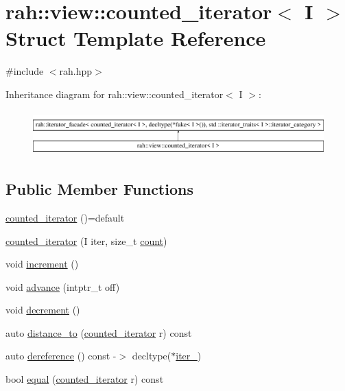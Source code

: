 \hypertarget{structrah_1_1view_1_1counted__iterator}{}\section{rah\+::view\+::counted\+\_\+iterator$<$ I $>$ Struct Template Reference}
\label{structrah_1_1view_1_1counted__iterator}


{\ttfamily \#include $<$rah.\+hpp$>$}

Inheritance diagram for rah\+::view\+::counted\+\_\+iterator$<$ I $>$\+:\begin{figure}[H]
\begin{center}
\leavevmode
\includegraphics[height=1.736434cm]{structrah_1_1view_1_1counted__iterator}
\end{center}
\end{figure}
\subsection*{Public Member Functions}
\begin{DoxyCompactItemize}
\item 
\mbox{\hyperlink{structrah_1_1view_1_1counted__iterator_a73f275166ac5f41bd93d96ccab15eab0}{counted\+\_\+iterator}} ()=default
\item 
\mbox{\hyperlink{structrah_1_1view_1_1counted__iterator_aa26e9c047e175303c296758316634890}{counted\+\_\+iterator}} (I iter, size\+\_\+t \mbox{\hyperlink{namespacerah_aa528865cc4a45d4eb276329554f16b4b}{count}})
\item 
void \mbox{\hyperlink{structrah_1_1view_1_1counted__iterator_a8113f67743f49650c0b4c872bcfd560e}{increment}} ()
\item 
void \mbox{\hyperlink{structrah_1_1view_1_1counted__iterator_abef44b581abb0c70a79dbd6a61ccd200}{advance}} (intptr\+\_\+t off)
\item 
void \mbox{\hyperlink{structrah_1_1view_1_1counted__iterator_abeb34df8feb243fce3eec27d45b19aa2}{decrement}} ()
\item 
auto \mbox{\hyperlink{structrah_1_1view_1_1counted__iterator_afee4b1d8525979cc4b711eba9b524f1d}{distance\+\_\+to}} (\mbox{\hyperlink{structrah_1_1view_1_1counted__iterator}{counted\+\_\+iterator}} r) const
\item 
auto \mbox{\hyperlink{structrah_1_1view_1_1counted__iterator_aa0478a9f3d2083f2cd9c42d32e8e4dd5}{dereference}} () const -\/$>$ decltype($\ast$\mbox{\hyperlink{structrah_1_1view_1_1counted__iterator_a907dba6ac64293e4c5718e522da4972e}{iter\+\_\+}})
\item 
bool \mbox{\hyperlink{structrah_1_1view_1_1counted__iterator_a71ee9eea167eec16b04373885dbff741}{equal}} (\mbox{\hyperlink{structrah_1_1view_1_1counted__iterator}{counted\+\_\+iterator}} r) const
\end{DoxyCompactItemize}
